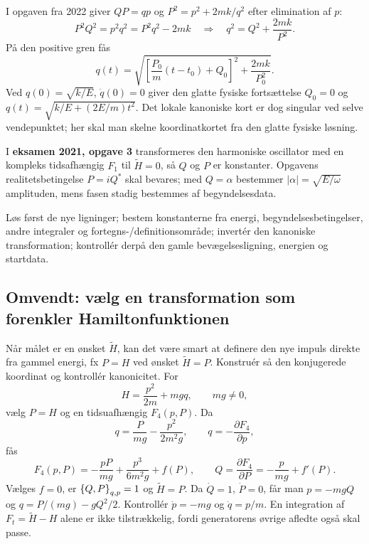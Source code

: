 I opgaven fra 2022 giver $QP=qp$ og $P^2=p^2+2mk/q^2$ efter elimination af $p$:
\[
P^2Q^2=p^2q^2=P^2q^2-2mk
\quad\Rightarrow\quad
q^2=Q^2+\frac{2mk}{P^2}.
\]
På den positive gren fås
\[
q(t)=\sqrt{\left[\frac{P_0}{m}(t-t_0)+Q_0\right]^2+\frac{2mk}{P_0^2}}.
\]
Ved $q(0)=\sqrt{k/E}$, $\dot q(0)=0$ giver den glatte fysiske fortsættelse $Q_0=0$ og
$q(t)=\sqrt{k/E+(2E/m)t^2}$. Det lokale kanoniske kort er dog singular ved selve vendepunktet; her skal man skelne koordinatkortet fra den glatte fysiske løsning.

I \textbf{eksamen 2021, opgave 3} transformeres den harmoniske oscillator med en kompleks tidsafhængig $F_1$ til $\widetilde H=0$, så $Q$ og $P$ er konstanter. Opgavens realitetsbetingelse $P=iQ^*$ skal bevares; med $Q=\alpha$ bestemmer $|\alpha|=\sqrt{E/\omega}$ amplituden, mens fasen stadig bestemmes af begyndelsesdata.
\begin{method}Løs først de nye ligninger; bestem konstanterne fra energi, begyndelsesbetingelser, andre integraler og fortegns-/definitionsområde; invertér den kanoniske transformation; kontrollér derpå den gamle bevægelsesligning, energien og startdata.\end{method}

\subsection{Omvendt: vælg en transformation som forenkler Hamiltonfunktionen}
Når målet er en ønsket $\widetilde H$, kan det være smart at definere den nye impuls direkte fra gammel energi, fx $P=H$ ved ønsket $\widetilde H=P$. Konstruér så den konjugerede koordinat og kontrollér kanonicitet.
For
\[
H=\frac{p^2}{2m}+mgq,\qquad mg\ne0,
\]
vælg $P=H$ og en tidsuafhængig $F_4(p,P)$. Da
\[
q=\frac{P}{mg}-\frac{p^2}{2m^2g},\qquad
q=-\frac{\partial F_4}{\partial p},
\]
fås
\[
\boxed{F_4(p,P)=-\frac{pP}{mg}+\frac{p^3}{6m^2g}+f(P),\qquad
Q=\frac{\partial F_4}{\partial P}=-\frac{p}{mg}+f'(P).}
\]
Vælges $f=0$, er $\left\{Q,P\right\}_{q,p}=1$ og $\widetilde H=P$. Da $\dot Q=1$, $\dot P=0$, får man
$p=-mgQ$ og $q=P/(mg)-gQ^2/2$. Kontrollér $\dot p=-mg$ og $\dot q=p/m$. En integration af $F_t=\widetilde H-H$ alene er ikke tilstrækkelig, fordi generatorens øvrige afledte også skal passe.

